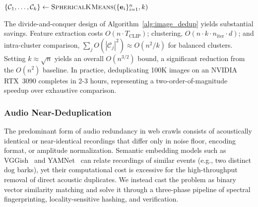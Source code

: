 \documentclass[conference]{IEEEtran}
\begin{document}
\begin{algorithm}[t]
\caption{Semantic Image Deduplication}
\label{alg:image_dedup}


$\{\mathcal{C}_1, \dots, \mathcal{C}_k\} \leftarrow 
\textsc{SphericalKMeans}(\{\mathbf{e}_i\}_{i=1}^{n}, k)$\;


\end{algorithm}


The divide-and-conquer design of Algorithm~\ref{alg:image_dedup} yields substantial savings. Feature extraction costs $O(n \cdot T_{\text{CLIP}})$; clustering, $O(n \cdot k \cdot n_{\text{iter}} \cdot d)$; and intra-cluster comparison, $\sum_j O(|\mathcal{C}_j|^2) \approx O(n^2/k)$ for balanced clusters. Setting $k \approx \sqrt{n}$ yields an overall $O(n^{3/2})$ bound, a significant reduction from the $O(n^2)$ baseline. In practice, deduplicating 100K images on an NVIDIA RTX~3090 completes in 2-3 hours, representing a two-order-of-magnitude speedup over exhaustive comparison.


\subsubsection{Audio Near-Deduplication}

The predominant form of audio redundancy in web crawls consists of acoustically identical or near-identical recordings that differ only in noise floor, encoding format, or amplitude normalization. Semantic embedding models such as VGGish~\cite{hershey2017cnnarchitectureslargescaleaudio} and YAMNet~\cite{s24072106} can relate recordings of similar events (e.g., two distinct dog barks), yet their computational cost is excessive for the high-throughput removal of direct acoustic duplicates. We instead cast the problem as binary vector similarity matching and solve it through a three-phase pipeline of spectral fingerprinting, locality-sensitive hashing, and verification.
\end{document}
